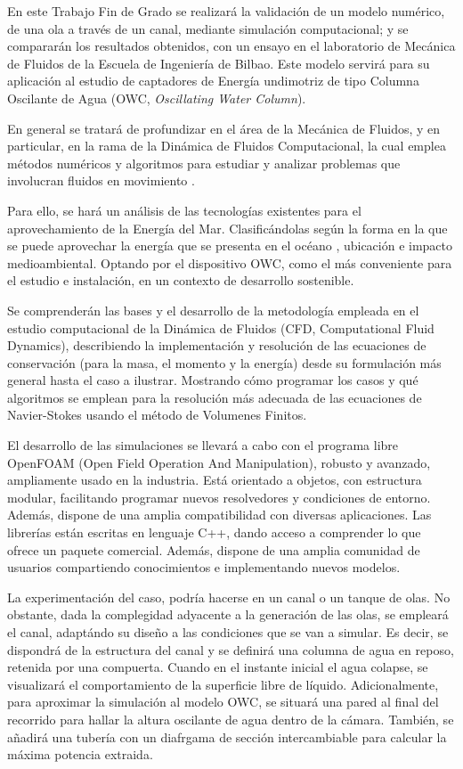 En este Trabajo Fin de Grado se realizará la validación de un modelo
numérico, de una ola a través de un canal, mediante simulación
computacional; y se compararán los resultados obtenidos, con un ensayo
en el laboratorio de Mecánica de Fluidos de la Escuela de Ingeniería de
Bilbao. Este modelo servirá para su aplicación al estudio de captadores
de Energía undimotriz de tipo Columna Oscilante de Agua (OWC,
\emph{Oscillating Water Column}).

En general se tratará de profundizar en el área de la Mecánica de
Fluidos, y en particular, en la rama de la Dinámica de Fluidos
Computacional, la cual emplea métodos numéricos y algoritmos para
estudiar y analizar problemas que involucran fluidos en movimiento
\cite{orrego09}.

Para ello, se hará un análisis de las tecnologías existentes para el
aprovechamiento de la Energía del Mar. Clasificándolas según la forma en
la que se puede aprovechar la energía que se presenta en el océano
\cite{amundarain12}, ubicación e impacto medioambiental. Optando por el
dispositivo OWC, como el más conveniente para el estudio e instalación,
en un contexto de desarrollo sostenible.

Se comprenderán las bases y el desarrollo de la metodología empleada en
el estudio computacional de la Dinámica de Fluidos (CFD, Computational
Fluid Dynamics), describiendo la implementación y resolución de las
ecuaciones de conservación (para la masa, el momento y la energía) desde
su formulación más general hasta el caso a ilustrar. Mostrando cómo
programar los casos y qué algoritmos se emplean para la resolución más
adecuada de las ecuaciones de Navier-Stokes usando el método de
Volumenes Finitos.

El desarrollo de las simulaciones se llevará a cabo con el programa
libre OpenFOAM (Open Field Operation And Manipulation), robusto y
avanzado, ampliamente usado en la industria. Está orientado a objetos,
con estructura modular, facilitando programar nuevos resolvedores y
condiciones de entorno. Además, dispone de una amplia compatibilidad con
diversas aplicaciones. Las librerías están escritas en lenguaje C++,
dando acceso a comprender lo que ofrece un paquete comercial. Además,
dispone de una amplia comunidad de usuarios compartiendo conocimientos e
implementando nuevos modelos.

La experimentación del caso, podría hacerse en un canal o un tanque de
olas. No obstante, dada la complegidad adyacente a la generación de las
olas, se empleará el canal, adaptándo su diseño a las condiciones que se
van a simular. Es decir, se dispondrá de la estructura del canal y se
definirá una columna de agua en reposo, retenida por una compuerta.
Cuando en el instante inicial el agua colapse, se visualizará el
comportamiento de la superficie libre de líquido. Adicionalmente, para
aproximar la simulación al modelo OWC, se situará una pared al final del
recorrido para hallar la altura oscilante de agua dentro de la cámara.
También, se añadirá una tubería con un diafrgama de sección
intercambiable para calcular la máxima potencia extraida.

